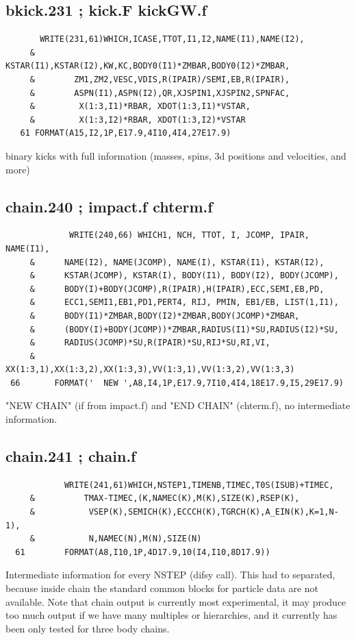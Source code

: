 \subsection{ bkick.231 ; kick.F kickGW.f }
 \begin{verbatim}
       WRITE(231,61)WHICH,ICASE,TTOT,I1,I2,NAME(I1),NAME(I2),
     &        KSTAR(I1),KSTAR(I2),KW,KC,BODY0(I1)*ZMBAR,BODY0(I2)*ZMBAR,
     &        ZM1,ZM2,VESC,VDIS,R(IPAIR)/SEMI,EB,R(IPAIR),
     &        ASPN(I1),ASPN(I2),QR,XJSPIN1,XJSPIN2,SPNFAC,
     &         X(1:3,I1)*RBAR, XDOT(1:3,I1)*VSTAR,
     &         X(1:3,I2)*RBAR, XDOT(1:3,I2)*VSTAR
   61 FORMAT(A15,I2,1P,E17.9,4I10,4I4,27E17.9)
 \end{verbatim}

binary kicks with full information (masses, spins, 3d positions and velocities, and more)

\subsection{ chain.240 ; impact.f chterm.f }
 \begin{verbatim}
             WRITE(240,66) WHICH1, NCH, TTOT, I, JCOMP, IPAIR, NAME(I1),
     &      NAME(I2), NAME(JCOMP), NAME(I), KSTAR(I1), KSTAR(I2),
     &      KSTAR(JCOMP), KSTAR(I), BODY(I1), BODY(I2), BODY(JCOMP),
     &      BODY(I)+BODY(JCOMP),R(IPAIR),H(IPAIR),ECC,SEMI,EB,PD,
     &      ECC1,SEMI1,EB1,PD1,PERT4, RIJ, PMIN, EB1/EB, LIST(1,I1),
     &      BODY(I1)*ZMBAR,BODY(I2)*ZMBAR,BODY(JCOMP)*ZMBAR,
     &      (BODY(I)+BODY(JCOMP))*ZMBAR,RADIUS(I1)*SU,RADIUS(I2)*SU,
     &      RADIUS(JCOMP)*SU,R(IPAIR)*SU,RIJ*SU,RI,VI,
     &      XX(1:3,1),XX(1:3,2),XX(1:3,3),VV(1:3,1),VV(1:3,2),VV(1:3,3)
 66       FORMAT('  NEW ',A8,I4,1P,E17.9,7I10,4I4,18E17.9,I5,29E17.9)
 \end{verbatim}

"NEW CHAIN" (if from impact.f) and "END CHAIN" (chterm.f), no intermediate information.

\subsection{ chain.241 ; chain.f }
 \begin{verbatim}
            WRITE(241,61)WHICH,NSTEP1,TIMENB,TIMEC,T0S(ISUB)+TIMEC,
     &          TMAX-TIMEC,(K,NAMEC(K),M(K),SIZE(K),RSEP(K),
     &           VSEP(K),SEMICH(K),ECCCH(K),TGRCH(K),A_EIN(K),K=1,N-1),
     &           N,NAMEC(N),M(N),SIZE(N)
  61        FORMAT(A8,I10,1P,4D17.9,10(I4,I10,8D17.9))
 \end{verbatim}

Intermediate information for every NSTEP (difsy call). This had to separated, because inside chain the standard common blocks for particle data are not available. Note that chain output is currently most experimental, it may produce too much output if we have many multiples or hierarchies, and it currently has been only tested for three body chains.